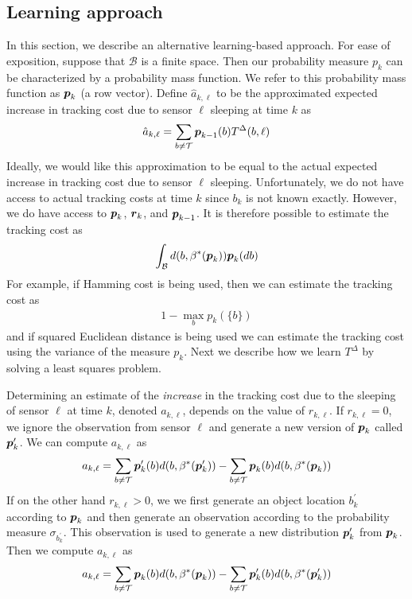 \documentclass[journal,draftcls,onecolumn,11pt]{IEEEtran}
\newcommand{\emb}[1]{\text{\boldmath{$#1$}}}
\newcommand{\term}{\mathcal{T}}
\begin{document}
\subsection{Learning approach}  \label{sec:learning}
In this section, we describe an alternative learning-based approach. For ease of exposition, suppose that $\mathcal{B}$ is a finite space.  Then our probability measure $p_k$ can be characterized by a probability mass function.  We refer to this probability mass function as $\emb{p}_k$ (a row vector).  Define $\hat{a}_{k,\ell}$ to be the approximated expected increase in tracking cost due to sensor $\ell$ sleeping at time $k$ as
\begin{align}
   \hat{a}_{k,\ell} = \sum_{b \neq \term} \emb{p}_{k-1}(b) T^\Delta(b,\ell)
\end{align}
Ideally, we would like this approximation to be equal to the actual expected increase in tracking cost due to sensor $\ell$ sleeping.  Unfortunately, we do not have access to actual tracking costs at time $k$ since $b_k$ is not known exactly.  However, we do have access to $\emb{p}_k$, $\emb{r}_k$, and $\emb{p}_{k-1}$.  It is therefore possible to estimate the tracking cost as
\begin{align}
   \int_{\mathcal{B}} d(b,\beta^*(\emb{p}_k)) \emb{p}_k(db)
\end{align}
For example, if Hamming cost is being used, then we can estimate the tracking cost as
\begin{align}
   1 - \max_{b} p_k(\{b\})
\end{align}
and if squared Euclidean distance is being used we can estimate the tracking cost using the variance of the measure $p_k$. Next we describe how we learn $T^\Delta$ by solving a least squares problem.

Determining an estimate of the {\em increase} in the tracking cost due to the sleeping of sensor $\ell$ at time $k$, denoted $a_{k,\ell}$, depends on the value of $r_{k,\ell}$.  If $r_{k,\ell} = 0$, we ignore the observation from sensor $\ell$ and generate a new version of $\emb{p}_k$ called $\emb{p}^\prime_k$.  We can compute $a_{k,\ell}$ as
\begin{align}
   a_{k,\ell} = \sum_{b \neq \term} \emb{p}^\prime_k(b) d(b,\beta^*(\emb{p}^\prime_k)) - \sum_{b \neq \term} \emb{p}_k(b) d(b,\beta^*(\emb{p}_k))
\end{align}
If on the other hand $r_{k,\ell} > 0$, we we first generate an object location $b^\prime_k$ according to $\emb{p}_k$ and then generate an observation according to the probability measure $\sigma_{b^\prime_k}$.  This observation is used to generate a new distribution $\emb{p}^\prime_k$ from $\emb{p}_k$.  Then we compute $a_{k,\ell}$ as
\begin{align}
   a_{k,\ell} = \sum_{b \neq \term} \emb{p}_k(b) d(b,\beta^*(\emb{p}_k)) - \sum_{b \neq \term} \emb{p}^\prime_k(b) d(b,\beta^*(\emb{p}^\prime_k))
\end{align}
\end{document}
